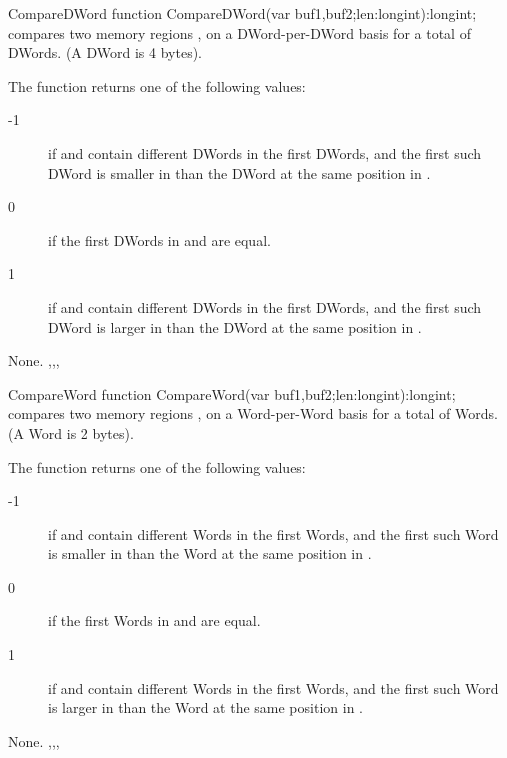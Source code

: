 
\begin{function}{CompareDWord}
\Declaration
function  CompareDWord(var buf1,buf2;len:longint):longint;
\Description
{} compares two memory regions , on a
DWord-per-DWord basis for a total of  DWords. (A DWord is 4 bytes).

The function returns one of the following values:
\begin{description}
\item[-1] if  and  contain different DWords
in the first  DWords, and the first such DWord is smaller in 
than the DWord at the same position in .
\item[0]  if the first  DWords in  and  are
equal.
\item [1] if  and  contain different DWords
in the first  DWords, and the first such DWord is larger in 
than the DWord at the same position in .
\end{description}
\Errors
None.
\SeeAlso
{},,,
\end{function}


\begin{function}{CompareWord}
\Declaration
function  CompareWord(var buf1,buf2;len:longint):longint;
\Description
{} compares two memory regions , on a
Word-per-Word basis for a total of  Words. (A Word is 2 bytes).

The function returns one of the following values:
\begin{description}
\item[-1] if  and  contain different Words
in the first  Words, and the first such Word is smaller in 
than the Word at the same position in .
\item[0]  if the first  Words in  and  are
equal.
\item [1] if  and  contain different Words
in the first  Words, and the first such Word is larger in 
than the Word at the same position in .
\end{description}
\Errors
None.
\SeeAlso
{},,,
\end{function}

